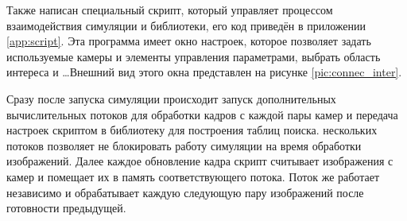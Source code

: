 Также написан специальный скрипт, который управляет процессом взаимодействия симуляции и библиотеки, 
его код приведён в приложении \ref{app:script}. Эта программа имеет окно настроек, которое позволяет задать
используемые камеры и элементы управления параметрами, выбрать область интереса и \dots Внешний вид этого 
окна представлен на рисунке \ref{pic:connec_inter}.


Сразу после запуска симуляции происходит запуск дополнительных вычислительных потоков для обработки 
кадров с каждой пары камер и передача настроек скриптом в библиотеку для построения таблиц поиска.           %
нескольких потоков позволяет не блокировать работу симуляции на время обработки изображений.  Далее 
каждое обновление кадра скрипт считывает изображения с камер и помещает их в память соответствующего 
потока. Поток же работает независимо и обрабатывает каждую следующую пару изображений после готовности 
предыдущей. 